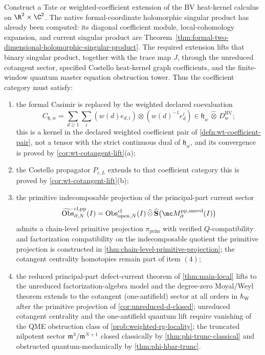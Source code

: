 \documentclass[11pt]{memoir}
\begin{document}
\begin{prob}\label{prob:formal-factorization-center}
  Construct a Tate or weighted-coefficient extension of the BV heat-kernel
  calculus on $\R^2\times\C^2$.  The native formal-coordinate
  holomorphic singular product has already been computed:
  its diagonal coefficient module, local-cohomology expansion, and
  current singular product are
  Theorem~\ref{thm:formal-two-dimensional-holomorphic-singular-product}.  The
  required extension lifts that binary singular product, together
  with the trace map \(J\), through the unreduced cotangent sector,
  specified Costello heat-kernel graph coefficients, and the finite-window
  quantum master equation obstruction tower.  Thus the coefficient
  category must satisfy:
  \begin{enumerate}
    \item the formal Casimir is replaced by the weighted declared
      coevaluation
      \[
        C_{\mathfrak h,w}
        =\sum_{d\geq 1}\sum_i
        (w(d)e_{d,i})\otimes(w(d)^{-1}e^i_d)
        \in
        \mathfrak h_w\,\widehat\otimes\,
        D^{\mathrm{BV}}_w;
      \]
      this is a kernel in the declared weighted coefficient pair of
      \ref{defn:wt-coefficient-pair}, not a tensor with the strict
      continuous dual of \(\mathfrak h_w\), and its convergence is proved
      by \ref{cor:wt-cotangent-lift}(a);
    \item the Costello propagator $P_{\epsilon,L}$ extends to that
      coefficient category
      this is proved by \ref{cor:wt-cotangent-lift}(b);
    \item the primitive indecomposable projection of the principal-part
      current sector
      $$\widetilde{\mathrm{Obs}}^{\mathrm{cl,pp}}_{\partial,N}(I)
      =\mathrm{Obs}^{\mathrm{cl}}_{\mathrm{open},N}(I)\,\widehat\otimes\,
      \widehat{\mathbf S}\bigl(\mc M^{\mathrm{pp,unred}}_\partial(I)\bigr)$$
      admits a chain-level primitive projection $\pi_{\mathrm{prim}}$
      with verified $Q$-compatibility and factorization compatibility on
      the indecomposable quotient
      the primitive projection is constructed in
      \ref{thm:chain-level-primitive-projection}; the cotangent
      centrality homotopies remain part of item $(4)$;
    \item the reduced principal-part defect-current theorem of
      \ref{thm:main-local} lifts to the unreduced factorization-algebra
      model and the degree-zero Moyal/Weyl theorem extends
      to the cotangent (one-antifield) sector at all orders in \(\hbar_{\mathrm{W}}\)
      after the primitive projection of \ref{cor:unreduced-d-closed};
      unreduced cotangent centrality and the one-antifield quantum lift require
      vanishing of the QME obstruction class of
      \ref{prob:weighted-rg-locality}; the truncated nilpotent sector
      $\mathfrak m^3/\mathfrak m^{N+1}$ closed classically by
      \ref{thm:phi-trunc-classical} and obstructed quantum-mechanically by
      \ref{thm:phi-hbar-trunc}.
  \end{enumerate}


\end{prob}
\end{document}

